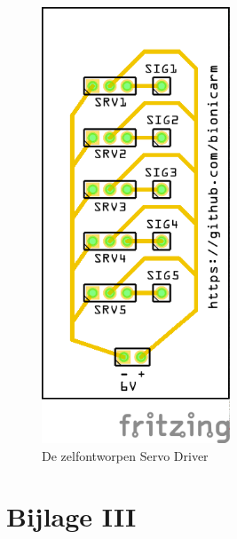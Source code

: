 \begin{figure}
\centering
\includegraphics[width=0.5\textwidth,height=\textheight]{img/image_24.png}
\caption{De zelfontworpen Servo Driver\label{fig:driver}}
\end{figure}

\pagebreak

\hypertarget{bijlage-iii}{%
\section*{Bijlage III}\label{bijlage-iii}}

